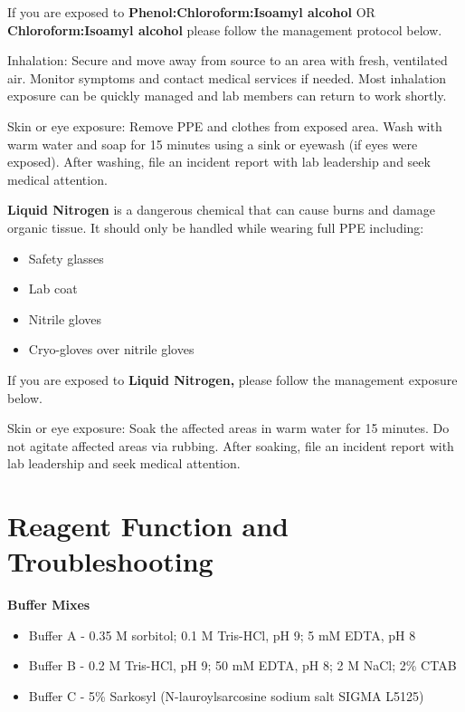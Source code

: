 \documentclass[
]{book}
\providecommand{\tightlist}{%
  \setlength{\itemsep}{0pt}\setlength{\parskip}{0pt}}
\begin{document}
If you are exposed to \textbf{Phenol:Chloroform:Isoamyl alcohol} OR \textbf{Chloroform:Isoamyl alcohol} please follow the management protocol below.~

Inhalation: Secure and move away from source to an area with fresh, ventilated air. Monitor symptoms and contact medical services if needed. Most inhalation exposure can be quickly managed and lab members can return to work shortly.~

Skin or eye exposure: Remove PPE and clothes from exposed area. Wash with warm water and soap for 15 minutes using a sink or eyewash (if eyes were exposed). After washing, file an incident report with lab leadership and seek medical attention.~

\textbf{Liquid Nitrogen} is a dangerous chemical that can cause burns and damage organic tissue. It should only be handled while wearing full PPE including:~

\begin{itemize}
\tightlist
\item
  Safety glasses
\item
  Lab coat
\item
  Nitrile gloves
\item
  Cryo-gloves over nitrile gloves
\end{itemize}

If you are exposed to \textbf{Liquid Nitrogen,} please follow the management exposure below.~

Skin or eye exposure: Soak the affected areas in warm water for 15 minutes. Do not agitate affected areas via rubbing. After soaking, file an incident report with lab leadership and seek medical attention.~

\hypertarget{reagent-function-and-troubleshooting}{%
\section{\texorpdfstring{\textbf{Reagent Function and Troubleshooting}~}{Reagent Function and Troubleshooting~}}\label{reagent-function-and-troubleshooting}}

\textbf{Buffer Mixes}~

\begin{itemize}
\item
  Buffer A - 0.35 M sorbitol; 0.1 M Tris-HCl, pH 9; 5 mM EDTA, pH 8~
\item
  Buffer B - 0.2 M Tris-HCl, pH 9; 50 mM EDTA, pH 8; 2 M NaCl; 2\% CTAB~
\item
  Buffer C - 5\% Sarkosyl (N-lauroylsarcosine sodium salt SIGMA L5125)~
\end{itemize}
\end{document}
